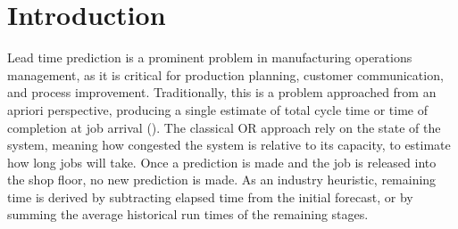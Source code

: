 \documentclass[
]{ceurart}
\begin{document}
\maketitle

\section{Introduction}







Lead time prediction is a prominent problem in manufacturing operations management, as it is 
critical for production planning, customer communication, and process improvement. Traditionally,
this is a problem approached from an apriori perspective, producing a single estimate of total cycle 
time or time of completion at job arrival (). The classical OR approach rely on the state of the system, 
meaning how congested the system is relative to its capacity, to estimate how long jobs will take. 
Once a prediction is made and the job is released into the shop floor, no new prediction is made. As an industry heuristic, 
remaining time is derived by subtracting elapsed time from the initial forecast, or by summing the average historical 
run times of the remaining stages.
\end{document}
